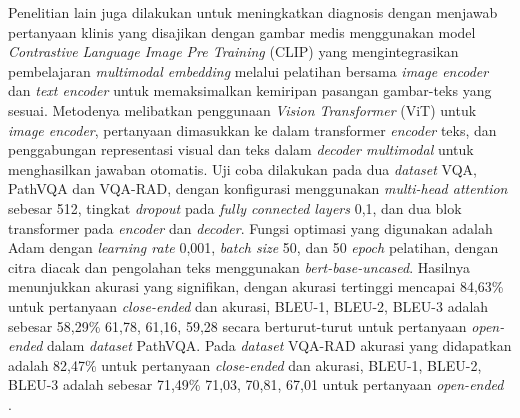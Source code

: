\par Penelitian lain juga dilakukan untuk meningkatkan diagnosis dengan menjawab pertanyaan klinis yang disajikan dengan gambar medis menggunakan model \textit{Contrastive Language Image Pre Training} (CLIP) yang mengintegrasikan pembelajaran \textit{multimodal embedding} melalui pelatihan bersama \textit{image encoder} dan \textit{text encoder} untuk memaksimalkan kemiripan pasangan gambar-teks yang sesuai. Metodenya melibatkan penggunaan \textit{Vision Transformer} (ViT) untuk \textit{image encoder}, pertanyaan dimasukkan ke dalam transformer \textit{encoder} teks, dan penggabungan representasi visual dan teks dalam \textit{decoder multimodal} untuk menghasilkan jawaban otomatis. Uji coba dilakukan pada dua \textit{dataset} VQA, PathVQA dan VQA-RAD, dengan konfigurasi menggunakan \textit{multi-head attention} sebesar 512, tingkat \textit{dropout} pada \textit{fully connected layers} 0,1, dan dua blok transformer pada \textit{encoder} dan \textit{decoder}. Fungsi optimasi yang digunakan adalah Adam dengan \textit{learning rate} 0,001, \textit{batch size} 50, dan 50 \textit{epoch} pelatihan, dengan citra diacak dan pengolahan teks menggunakan \textit{bert-base-uncased}. Hasilnya menunjukkan akurasi yang signifikan, dengan akurasi tertinggi mencapai 84,63\% untuk pertanyaan \textit{close-ended} dan akurasi, BLEU-1, BLEU-2, BLEU-3 adalah sebesar 58,29\% 61,78, 61,16, 59,28 secara berturut-turut untuk pertanyaan \textit{open-ended} dalam \textit{dataset} PathVQA. Pada \textit{dataset} VQA-RAD akurasi yang didapatkan adalah 82,47\% untuk pertanyaan \textit{close-ended} dan akurasi, BLEU-1, BLEU-2, BLEU-3 adalah sebesar 71,49\% 71,03, 70,81, 67,01 untuk pertanyaan \textit{open-ended} \citep{bazi2023vision}.





